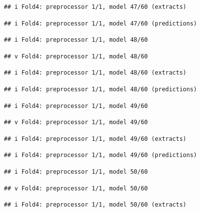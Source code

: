 \documentclass[
]{article}
\begin{document}
\begin{verbatim}
## i Fold4: preprocessor 1/1, model 47/60 (extracts)
\end{verbatim}

\begin{verbatim}
## i Fold4: preprocessor 1/1, model 47/60 (predictions)
\end{verbatim}

\begin{verbatim}
## i Fold4: preprocessor 1/1, model 48/60
\end{verbatim}

\begin{verbatim}
## v Fold4: preprocessor 1/1, model 48/60
\end{verbatim}

\begin{verbatim}
## i Fold4: preprocessor 1/1, model 48/60 (extracts)
\end{verbatim}

\begin{verbatim}
## i Fold4: preprocessor 1/1, model 48/60 (predictions)
\end{verbatim}

\begin{verbatim}
## i Fold4: preprocessor 1/1, model 49/60
\end{verbatim}

\begin{verbatim}
## v Fold4: preprocessor 1/1, model 49/60
\end{verbatim}

\begin{verbatim}
## i Fold4: preprocessor 1/1, model 49/60 (extracts)
\end{verbatim}

\begin{verbatim}
## i Fold4: preprocessor 1/1, model 49/60 (predictions)
\end{verbatim}

\begin{verbatim}
## i Fold4: preprocessor 1/1, model 50/60
\end{verbatim}

\begin{verbatim}
## v Fold4: preprocessor 1/1, model 50/60
\end{verbatim}

\begin{verbatim}
## i Fold4: preprocessor 1/1, model 50/60 (extracts)
\end{verbatim}
\end{document}
